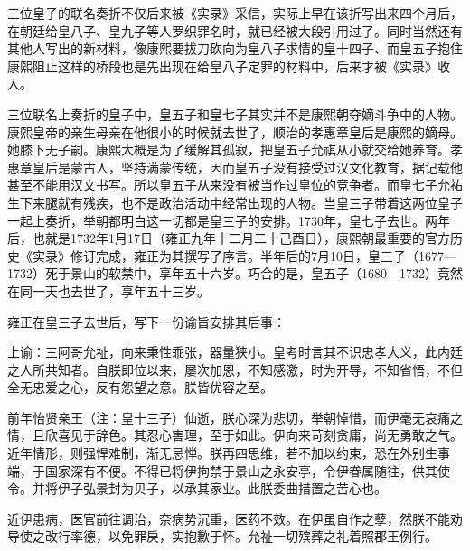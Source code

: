
三位皇子的联名奏折不仅后来被《实录》采信，实际上早在该折写出来四个月后，在朝廷给皇八子、皇九子等人罗织罪名时，就已经被大段引用过了。同时当然还有其他人写出的新材料，像康熙要拔刀砍向为皇八子求情的皇十四子、而皇五子抱住康熙阻止这样的桥段也是先出现在给皇八子定罪的材料中，后来才被《实录》收入。






三位联名上奏折的皇子中，皇五子和皇七子其实并不是康熙朝夺嫡斗争中的人物。康熙皇帝的亲生母亲在他很小的时候就去世了，顺治的孝惠章皇后是康熙的嫡母。她膝下无子嗣。康熙大概是为了缓解其孤寂，把皇五子允祺从小就交给她养育。孝惠章皇后是蒙古人，坚持满蒙传统，因而皇五子没有接受过汉文化教育，据记载他甚至不能用汉文书写。所以皇五子从来没有被当作过皇位的竞争者。而皇七子允祐生下来腿就有残疾，也不是政治活动中经常出现的人物。当皇三子带着这两位皇子一起上奏折，举朝都明白这一切都是皇三子的安排。1730年，皇七子去世。两年后，也就是1732年1月17日（雍正九年十二月二十己酉日），康熙朝最重要的官方历史《实录》修订完成，雍正为其撰写了序言。半年后的7月10日，皇三子（1677—1732）死于景山的软禁中，享年五十六岁。巧合的是，皇五子（1680—1732）竟然在同一天也去世了，享年五十三岁。



雍正在皇三子去世后，写下一份谕旨安排其后事：



\begin{bookquote}上谕：三阿哥允祉，向来秉性乖张，器量狭小。皇考时言其不识忠孝大义，此内廷之人所共知者。自朕即位以来，屡次加恩，不知感激，时为开导，不知省悟，不但全无忠爱之心，反有怨望之意。朕皆优容之至。\end{bookquote}


\begin{bookquote}前年怡贤亲王（注：皇十三子）仙逝，朕心深为悲切，举朝悼惜，而伊毫无哀痛之情，且欣喜见于辞色。其忍心害理，至于如此。伊向来苛刻贪庸，尚无勇敢之气。近年情形，则强悍难制，渐无忌惮。朕再四思维，若不加以约束，恐在外别生事端，于国家深有不便。不得已将伊拘禁于景山之永安亭，令伊眷属随往，供其使令。并将伊子弘景封为贝子，以承其家业。此朕委曲措置之苦心也。\end{bookquote}


\begin{bookquote}近伊患病，医官前往调治，奈病势沉重，医药不效。在伊虽自作之孽，然朕不能劝导使之改行率德，以免罪戾，实抱歉于怀。允祉一切殡葬之礼着照郡王例行。\end{bookquote}

